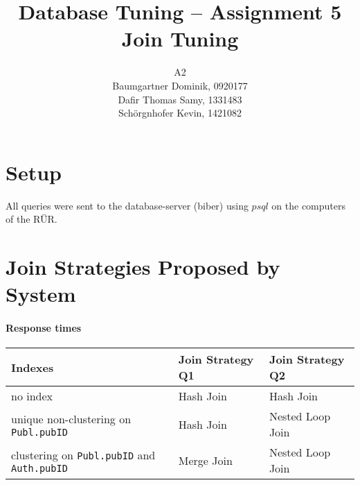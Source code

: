 \documentclass[11pt]{scrartcl}
\title{
  \textbf{\large Database Tuning -- Assignment 5}\\
  Join Tuning
}
\author{
A2\\
\large Baumgartner Dominik, 0920177 \\
\large Dafir Thomas Samy, 1331483 \\
\large Sch\"orgnhofer Kevin, 1421082
}
\begin{document}
\maketitle
\section{Setup}
All queries were sent to the database-server (biber) using $psql$ on the computers of the R\"UR.

\section{Join Strategies Proposed by System}

\paragraph{Response times}

\begin{flushleft}
\begin{tabular}{l|l|l}
  Indexes & Join Strategy Q1 & Join Strategy Q2\\
  \hline
  no index & Hash Join & Hash Join  \\
  unique non-clustering on {\tt Publ.pubID} & Hash Join  & Nested Loop Join \\
  clustering on {\tt Publ.pubID} and {\tt Auth.pubID} & Merge Join & Nested Loop Join \\
\end{tabular}
\end{flushleft}
\end{document}
